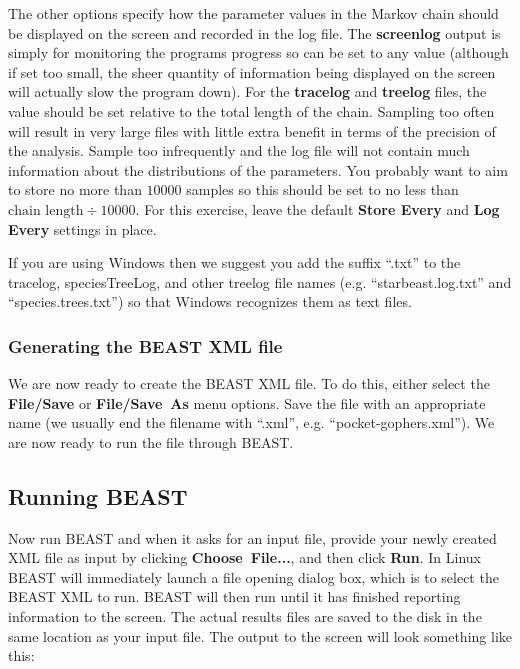 \documentclass{article}
\begin{document}
The other options specify how the parameter values in the Markov chain should be
displayed on the screen and recorded in the log file. The \textbf{screenlog} output is
simply for monitoring the programs progress so can be set to any value (although
if set too small, the sheer quantity of information being displayed on the
screen will actually slow the program down). For the \textbf{tracelog} and \textbf{treelog} files, the value should
be set relative to the total length of the chain. Sampling too often will result
in very large files with little extra benefit in terms of the precision of the
analysis. Sample too infrequently and the log file will not contain much
information about the distributions of the parameters. You probably want to aim
to store no more than $10000$ samples so this should be set to no less than
$\text{chain length}\div10000$. For this exercise, leave the default \textbf{Store
Every} and \textbf{Log Every} settings in place.

If you are using Windows then we suggest you add the suffix ``.txt'' to the
tracelog, speciesTreeLog, and other treelog file names (e.g.
``starbeast.log.txt'' and ``species.trees.txt'') so that Windows recognizes them as text files.

\subsubsection*{Generating the BEAST XML file}

We are now ready to create the BEAST XML file. To do this, either select the
\textbf{File/Save} or \textbf{File/Save~As} menu options. Save the file with an
appropriate name (we usually end the filename with ``.xml'', e.g.
``pocket-gophers.xml''). We are now ready to run the file through BEAST.

\subsection*{Running BEAST}

Now run BEAST and when it asks for an input file, provide your newly created XML
file as input by clicking \textbf{Choose~File...}, and then click \textbf{Run}.
In Linux BEAST will immediately launch a file opening dialog box, which is to
select the BEAST XML to run. BEAST will then run until it has finished reporting
information to the screen. The actual results files are saved to the disk in the
same location as your input file. The output to the screen will look something
like this:
\end{document}
